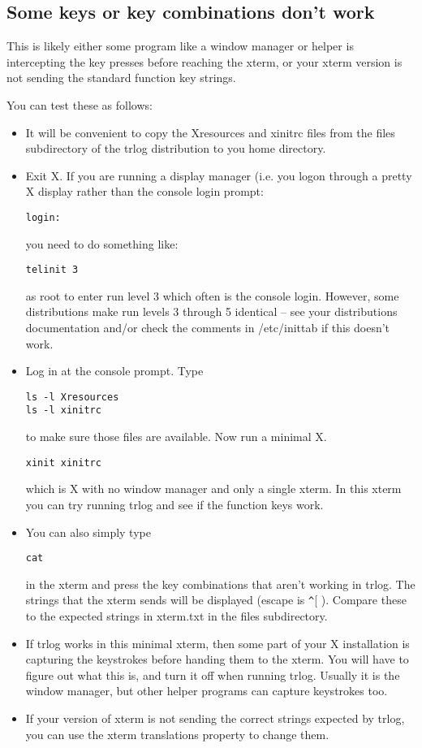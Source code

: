 \documentclass[12pt]{article}
\begin{document}
\subsection{Some keys or key combinations don't work}
This is likely either some program like a window manager or helper
is intercepting the key presses before reaching the xterm, or your xterm
version is not sending the standard function key strings.

You can test these as follows:
\begin{itemize}
\item
It will be convenient to copy the Xresources and xinitrc files
from the files subdirectory of the trlog distribution to you home directory.
\item
Exit X. If you are running a display manager (i.e. you logon through a
pretty X display rather than the console login prompt:
\begin{verbatim}
login:
\end{verbatim}
you need to do something like:
\begin{verbatim}
telinit 3
\end{verbatim}
as root to enter run level 3 which often is the console login. However,
some distributions make run levels 3 through 5 identical -- see your
distributions documentation and/or check
the comments in /etc/inittab if this doesn't work.
\item
Log in at the console prompt. Type
\begin{verbatim}
ls -l Xresources
ls -l xinitrc
\end{verbatim}
to make sure those files are available.
Now run a minimal X.
\begin{verbatim}
xinit xinitrc
\end{verbatim}
which is X with no window manager and only a single xterm. In this xterm
you can try running trlog and see if the function keys work.
\item
You can also simply type
\begin{verbatim}
cat
\end{verbatim}
in the xterm and press the key combinations that aren't working in trlog.
The strings that the xterm sends will be displayed (escape is \verb|^|[ ).
Compare these to the expected strings in xterm.txt in the files subdirectory.

\item
If trlog works in this minimal xterm,
then some part of your X installation is capturing the
keystrokes before handing them to the xterm.
You will have to figure out what this is, and turn it off when running
trlog.
Usually it is the window manager, but other helper programs can capture
keystrokes too.
\item
If your version of xterm is not sending the correct strings expected
by trlog, you can
use the xterm translations property to change them. 

\end{itemize}
\end{document}
